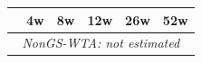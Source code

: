\begin{tabular}{l*{5}{c}}
\toprule
 & 4w & 8w & 12w & 26w & 52w \\
\midrule
\multicolumn{6}{c}{\textit{NonGS-WTA: not estimated}} \\
\bottomrule
\end{tabular}
